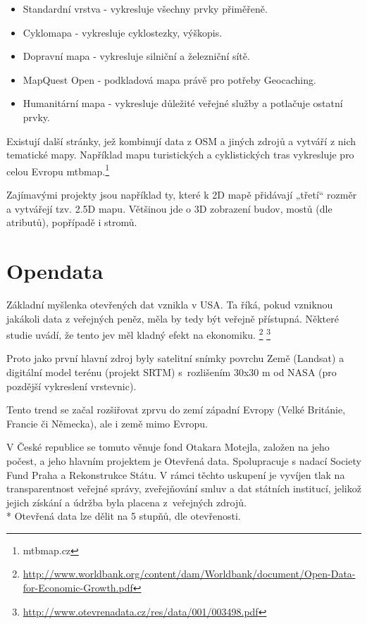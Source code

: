 \begin{itemize}
  \item Standardní vrstva - vykresluje všechny prvky přiměřeně.
  \item Cyklomapa - vykresluje cyklostezky, výškopis. 
  \item Dopravní mapa - vykresluje silniční a železniční sítě.
  \item MapQuest Open - podkladová mapa právě pro potřeby Geocaching.
  \item Humanitární mapa - vykresluje důležité veřejné služby a potlačuje ostatní prvky. 
\end{itemize}

Existují další stránky, jež kombinují data z OSM a jiných zdrojů a vytváří z nich tematické mapy.
Například mapu turistických a cyklistických tras vykresluje
pro celou Evropu mtbmap.\footnote{mtbmap.cz}

Zajímavými projekty jsou například ty, které k 2D mapě přidávají „třetí“ rozměr a
vytvářejí tzv. 2.5D mapu. Většinou jde o 3D zobrazení budov, mostů (dle
atributů), popřípadě i stromů.



\section{Opendata}
\label{opendata}

Základní myšlenka otevřených dat vznikla v USA.
Ta říká, pokud vzniknou jakákoli data z veřejných peněz, měla by tedy být
veřejně přístupná. Některé studie uvádí, že tento jev měl kladný efekt na ekonomiku.
\footnote{\url{http://www.worldbank.org/content/dam/Worldbank/document/Open-Data-for-Economic-Growth.pdf}}
\footnote{\url{http://www.otevrenadata.cz/res/data/001/003498.pdf}}

Proto jako první hlavní zdroj byly satelitní snímky povrchu Země (Landsat) %
a digitální model terénu (projekt SRTM) %
s~rozlišením 30x30 m od NASA (pro pozdější vykreslení vrstevnic).

Tento trend se začal rozšiřovat zprvu do zemí západní Evropy
(Velké Británie, Francie či Německa), ale i země mimo Evropu.\cite{OpendataTrends}

V České republice se tomuto věnuje fond Otakara Motejla, založen na jeho počest,
a jeho hlavním projektem je Otevřená data. Spolupracuje s nadací Society Fund
Praha a Rekonstrukce Státu.
V rámci těchto uskupení je vyvíjen tlak na transparentnost veřejné správy,
zveřejňování smluv a dat státních institucí, jelikož jejich získání a údržba byla
placena z~veřejných zdrojů.
\\*
Otevřená data lze dělit na 5 stupňů,
dle otevřenosti.

